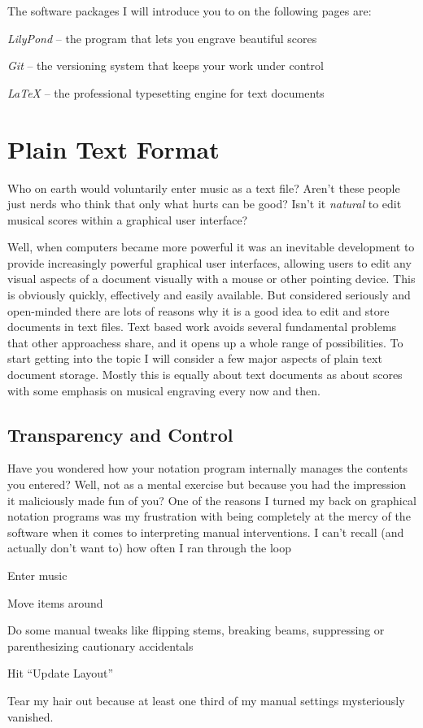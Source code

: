 \documentclass[../../LilyPond-Tutorials]{subfiles}
\begin{document}
The software packages I will introduce you to on the following pages are:
\begin{itemize*}
\item \emph{LilyPond} -- the program that lets you engrave beautiful scores
\item \emph{Git} -- the versioning system that keeps your work under control
\item \emph{\LaTeX} -- the professional typesetting engine for text documents
\end{itemize*}

\chapter{Plain Text Format}
\label{chap:pt_plain-text-format}
Who on earth would voluntarily enter music as a text file?
Aren't these people just nerds who think that only what hurts can be good?
Isn't it \emph{natural} to edit musical scores within a graphical user interface?

Well, when computers became more powerful it was an inevitable development to provide increasingly powerful graphical user interfaces, allowing users to edit any visual aspects of a document visually with a mouse or other pointing device.
This is obviously quickly, effectively and easily available.
But considered seriously and open-minded there are lots of reasons why it is a good idea to edit and store documents in text files.
Text based work avoids several fundamental problems that other approachess share, and it opens up a whole range of possibilities.
To start getting into the topic I will consider a few major aspects of plain text document storage.
Mostly this is equally about text documents as about scores with some emphasis on musical engraving every now and then.

\section*{Transparency and Control}
\label{sec:pt_transparency-and-control}
Have you wondered how your notation program internally manages the contents you entered?
Well, not as a mental exercise but because you had the impression it maliciously made fun of you?
One of the reasons I turned my back on graphical notation programs was my frustration with being completely at the mercy of the software when it comes to interpreting manual interventions.
I can't recall (and actually don't want to) how often I ran through the loop
\begin{inparaenum}[1.)]
\item Enter music 
\item Move items around 
\item Do some manual tweaks like flipping stems, breaking beams, suppressing or parenthesizing cautionary accidentals 
\item Hit “Update Layout” 
\item Tear my hair out because at least one third of my manual settings mysteriously vanished.
\end{inparaenum}
\end{document}
